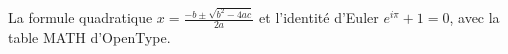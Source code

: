 \hsize=380pt La formule quadratique $x=\frac{-b\pm\sqrt{b^2-4ac}}{2a}$ et l'identit\'e d'Euler $e^{i\pi}+1=0$, avec la table MATH d'OpenType.\par
